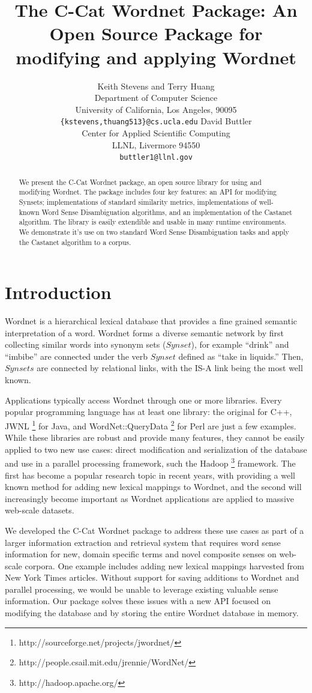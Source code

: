 \documentclass[a4paper,11pt]{article}
\title{The C-Cat Wordnet Package: An Open Source Package for modifying and
applying Wordnet}
\author{ Keith Stevens and Terry Huang\\
  Department of Computer Science\\
  University of California, Los Angeles, 90095\\
  {\tt \{kstevens,thuang513\}@cs.ucla.edu} \And
  David Buttler \\
  Center for Applied Scientific Computing\\
  LLNL, Livermore 94550\\
  {\tt buttler1@llnl.gov} 
  }
\date{}
\begin{document}
\maketitle
\begin{abstract}

We present the C-Cat Wordnet package, an open source library for using and
modifying Wordnet.  The package includes four key features: an API for modifying Synsets; implementations of standard similarity
metrics, implementations of well-known Word Sense Disambiguation algorithms, and an
implementation of the Castanet algorithm.  The library is easily extendible and usable in many runtime environments.  We demonstrate it's use on two standard Word Sense Disambiguation tasks and apply the Castanet algorithm to a corpus.
\end{abstract}

\section{Introduction}

Wordnet \cite{fellbaum98wordnet} is a hierarchical lexical database that provides a fine grained semantic interpretation of a word. 
Wordnet forms a diverse semantic network by first collecting similar words into synonym sets ($Synset$), for example ``drink'' and ``imbibe'' are connected under the verb $Synset$ defined as ``take in liquids.''  Then, $Synsets$ are connected by relational links, with the IS-A link being the most well known.

Applications typically access Wordnet through one or more libraries.  Every popular programming language has at least one library: the original for C++, JWNL \footnote{http://sourceforge.net/projects/jwordnet/} for Java, and
WordNet::QueryData \footnote{http://people.csail.mit.edu/jrennie/WordNet/} for
Perl are just a few examples.  While these libraries are robust and provide many features, they cannot be easily applied to two new use cases: direct modification and serialization of the database and use in a parallel processing framework, such the Hadoop \footnote{http://hadoop.apache.org/} framework.  The first has become a popular research topic in recent years, with  providing a well known method for adding new lexical mappings to Wordnet, and the second will increasingly become important as Wordnet applications are applied to massive web-scale datasets.

We developed the C-Cat Wordnet package to address these use cases as part
of a larger information extraction and retrieval system that requires word sense information for new, domain specific terms and novel composite senses on web-scale corpora.  One example includes adding new lexical mappings harvested from New York Times articles.  Without support for saving additions to Wordnet and parallel processing, we would be unable to leverage existing valuable sense information.  Our package solves these issues with a new API focused on modifying the database and by storing the
entire Wordnet database in memory.
\end{document}
